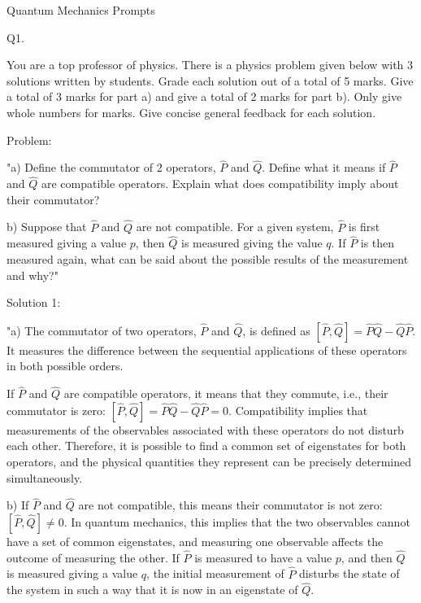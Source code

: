 
Quantum Mechanics Prompts

                           Q1. 

You are a top professor of physics. There is a physics problem given below with 3 solutions written by students. Grade each solution out of a total of 5 marks. Give a total of 3 marks for part a) and give a total of 2 marks for part b). Only give whole numbers for marks. Give concise general feedback for each solution. 

Problem: 

"a) Define the commutator of 2 operators, \( \hat{P} \) and \( \hat{Q} \). Define what it means if \( \hat{P} \) and \( \hat{Q} \) are compatible operators. Explain what does compatibility imply about their commutator?

b) Suppose that \( \hat{P} \) and \( \hat{Q} \) are not compatible. For a given system, \( \hat{P} \) is first measured giving a value \( p \), then \( \hat{Q} \) is measured giving the value \( q \). If \( \hat{P} \) is then measured again, what can be said about the possible results of the measurement and why?"

Solution 1:

"a) The commutator of two operators, \( \hat{P} \) and \( \hat{Q} \), is defined as \([ \hat{P}, \hat{Q} ] = \hat{P}\hat{Q} - \hat{Q}\hat{P}\). It measures the difference between the sequential applications of these operators in both possible orders.

If \( \hat{P} \) and \( \hat{Q} \) are compatible operators, it means that they commute, i.e., their commutator is zero: \([ \hat{P}, \hat{Q} ] = \hat{P}\hat{Q} - \hat{Q}\hat{P} = 0\). Compatibility implies that measurements of the observables associated with these operators do not disturb each other. Therefore, it is possible to find a common set of eigenstates for both operators, and the physical quantities they represent can be precisely determined simultaneously.

b) If \( \hat{P} \) and \( \hat{Q} \) are not compatible, this means their commutator is not zero: \([ \hat{P}, \hat{Q} ] \neq 0\). In quantum mechanics, this implies that the two observables cannot have a set of common eigenstates, and measuring one observable affects the outcome of measuring the other. If \( \hat{P} \) is measured to have a value \( p \), and then \( \hat{Q} \) is measured giving a value \( q \), the initial measurement of \( \hat{P} \) disturbs the state of the system in such a way that it is now in an eigenstate of \( \hat{Q} \).

